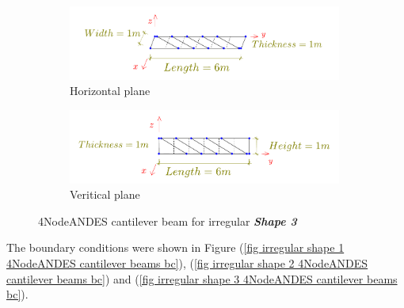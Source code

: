 \documentclass[fleqn,11pt,letter]{article}
\begin{document}
\begin{figure}[H]
  \centering
    \begin{subfigure}{0.5\textwidth}
      \centering
      \includegraphics[width=9cm]{../Figure_files/4NodeANDES/beam_ANDES_xy_bending_pureshape3.pdf}
      \caption{Horizontal plane}
    \end{subfigure}
    \begin{subfigure}{0.5\textwidth}
      \centering
      \includegraphics[width=9cm]{../Figure_files/4NodeANDES/beam_ANDES_yz_inPlane_pureshape3.pdf}
      \caption{Veritical  plane}
    \end{subfigure}
  \caption{4NodeANDES cantilever beam for irregular \textbf{\emph{Shape 3}} }
  \label{fig irregular shape 3 4NodeANDES cantilever beams }
\end{figure}






The boundary conditions were shown in Figure (\ref{fig irregular shape 1 4NodeANDES cantilever beams bc}), (\ref{fig irregular shape 2 4NodeANDES cantilever beams bc}) and (\ref{fig irregular shape 3 4NodeANDES cantilever beams bc}).
\end{document}
